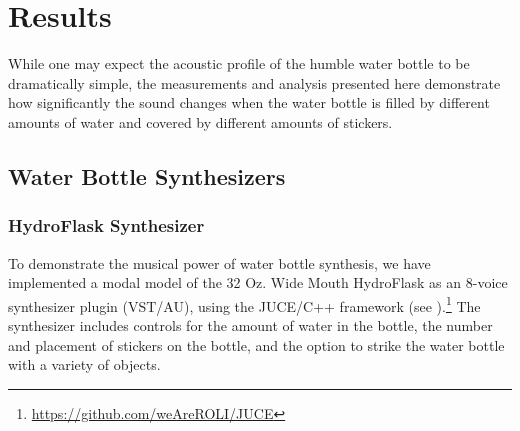 \documentclass[twoside,a4paper]{article}
\begin{document}
\section{Results} \label{sec:results}
%
While one may expect the acoustic profile of the humble water bottle to be dramatically simple, the measurements and analysis presented here demonstrate how significantly the sound changes when the water bottle is filled by different amounts of water and covered by different amounts of stickers. 

%
\subsection{Water Bottle Synthesizers} \label{sec:synth}

\subsubsection{HydroFlask Synthesizer}
To demonstrate the musical power of water bottle synthesis, we have
implemented a modal model of the 32 Oz. Wide Mouth HydroFlask
as an 8-voice synthesizer plugin (VST/AU), using the JUCE/C++
framework (see ).\footnote{\url{https://github.com/weAreROLI/JUCE}}
The synthesizer includes controls for the amount of water in the bottle,
the number and placement of stickers on the bottle, and the option to
strike the water bottle with a variety of objects. 
\end{document}
